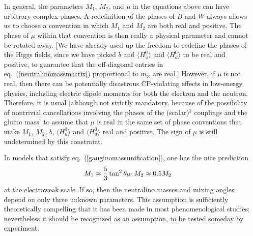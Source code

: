 \documentclass[12pt]{article}
\def\beq{\begin{eqnarray}}
\def\eeq{\end{eqnarray}}
\def\stilde{\widetilde}
\begin{document}
In general, the parameters $M_1$, $M_2$, and $\mu$ in the equations above 
can have arbitrary complex phases. A redefinition of the phases of 
$\stilde B$ and $\stilde W$ always allows us to choose a convention in 
which $M_1$ and $M_2$ are both real and positive. The phase of $\mu$ 
within that convention is then really a physical parameter and cannot be 
rotated away. [We have already used up the freedom to redefine the phases 
of the Higgs fields, since we have picked $b$ and $\langle H_u^0\rangle$ 
and $\langle H_d^0 \rangle$ to be real and positive, to guarantee that the 
off-diagonal entries in eq.~(\ref{neutralinomassmatrix}) proportional to 
$m_Z$ are real.] However, if $\mu$ is not real, then there can be 
potentially disastrous CP-violating effects in low-energy physics, 
including electric dipole moments for both the electron and the neutron. 
Therefore, it is usual [although not strictly mandatory, because of the 
possibility of nontrivial cancellations involving the phases of the 
(scalar)$^3$ couplings and the gluino mass] to assume that $\mu$ is real 
in the same set of phase conventions that make $M_1$, $M_2$, $b$, $\langle 
H_u^0\rangle$ and $\langle H_d^0 \rangle$ real and positive. The sign of 
$\mu$ is still undetermined by this constraint.

In models that satisfy eq.~(\ref{gauginomassunification}), one has the
nice prediction
\beq
M_1 \approx {5\over 3}\tan^2\theta_W \, M_2 \approx 0.5 M_2
\label{usualm1m2}
\eeq
at the electroweak scale. If so, then the neutralino masses and mixing 
angles depend on only three unknown parameters. This assumption is 
sufficiently theoretically compelling that it has been made in most 
phenomenological studies; nevertheless it should be recognized as an 
assumption, to be tested someday by experiment.
\end{document}
